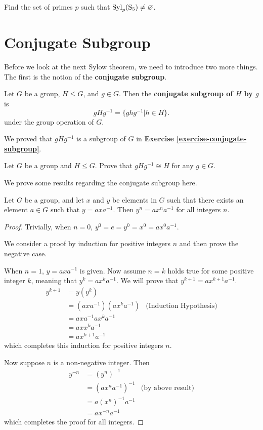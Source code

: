 \begin{exercise}
    Find the set of primes $p$ such that $\mathrm{Syl}_{p}(\mathrm{S}_{5}) \neq \varnothing$.
\end{exercise}

\section{Conjugate Subgroup}
Before we look at the next Sylow theorem, we need to introduce two more things. The first is the notion of the \textbf{conjugate subgroup}.
\begin{definition}
    Let $G$ be a group, $H \leq G$, and $g \in G$. Then the \textbf{conjugate subgroup of $H$ by $g$} is
    \[
        gHg^{-1} = \{ghg^{-1} \vert h \in H\}.
    \]
    under the group operation of $G$.
\end{definition}
We proved that $gHg^{-1}$ is a subgroup of $G$ in \textbf{Exercise \ref{exercise-conjugate-subgroup}}.

\begin{exercise}\label{exercise-conjugate-subgroup-isomorphic-to-subgroup}
    Let $G$ be a group and $H \leq G$. Prove that $gHg^{-1} \cong H$ for any $g \in G$.
\end{exercise}

We prove some results regarding the conjugate subgroup here.
\begin{proposition}\label{prop-power-of-conjugate-equals-conjugate-of-power}
    Let $G$ be a group, and let $x$ and $y$ be elements in $G$ such that there exists an element $a \in G$ such that $y = axa^{-1}$. Then $y^n = ax^na^{-1}$ for all integers $n$.
\end{proposition}
\begin{proof}
    Trivially, when $n = 0$, $y^0 = e = y^0 = x^0 = ax^0a^{-1}$.

    We consider a proof by induction for positive integers $n$ and then prove the negative case.

    When $n = 1$, $y = axa^{-1}$ is given. Now assume $n = k$ holds true for some positive integer $k$, meaning that $y^k = ax^ka^{-1}$. We will prove that $y^{k+1} = ax^{k+1}a^{-1}$.
    \begin{align*}
        y^{k+1} &= y(y^k)\\
        &= (axa^{-1})(ax^ka^{-1}) & \text{(Induction Hypothesis)}\\
        &= axa^{-1}ax^ka^{-1}\\
        &= axx^ka^{-1}\\
        &= ax^{k+1}a^{-1}
    \end{align*}
    which completes this induction for positive integers $n$.

    Now suppose $n$ is a non-negative integer. Then
    \begin{align*}
        y^{-n} &= (y^n)^{-1}\\
        &= (ax^na^{-1})^{-1} & \text{(by above result)}\\
        &= a(x^n)^{-1}a^{-1}\\
        &= ax^{-n}a^{-1}
    \end{align*}
    which completes the proof for all integers.
\end{proof}



